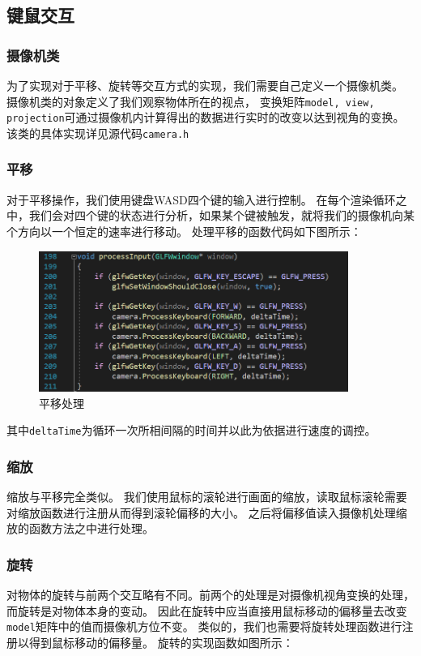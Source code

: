 \documentclass[UTF8]{ctexart}
\begin{document}
\subsection{键鼠交互}

\subsubsection{摄像机类}
\par
为了实现对于平移、旋转等交互方式的实现，我们需要自己定义一个摄像机类。
摄像机类的对象定义了我们观察物体所在的视点，
变换矩阵\verb|model, view, projection|可通过摄像机内计算得出的数据进行实时的改变以达到视角的变换。
该类的具体实现详见源代码\verb|camera.h|

\subsubsection{平移}
\par
对于平移操作，我们使用键盘WASD四个键的输入进行控制。
在每个渲染循环之中，我们会对四个键的状态进行分析，如果某个键被触发，就将我们的摄像机向某个方向以一个恒定的速率进行移动。
处理平移的函数代码如下图所示：

\begin{figure}[h]
	\centering
	\includegraphics*[width=0.9\textwidth]{4.png}
	\caption{平移处理}
	\label{fig:4}
\end{figure}
\par
其中\verb|deltaTime|为循环一次所相间隔的时间并以此为依据进行速度的调控。

\subsubsection{缩放}
\par
缩放与平移完全类似。
我们使用鼠标的滚轮进行画面的缩放，读取鼠标滚轮需要对缩放函数进行注册从而得到滚轮偏移的大小。
之后将偏移值读入摄像机处理缩放的函数方法之中进行处理。

\subsubsection{旋转}
\par
对物体的旋转与前两个交互略有不同。前两个的处理是对摄像机视角变换的处理，而旋转是对物体本身的变动。
因此在旋转中应当直接用鼠标移动的偏移量去改变\verb|model|矩阵中的值而摄像机方位不变。
类似的，我们也需要将旋转处理函数进行注册以得到鼠标移动的偏移量。
旋转的实现函数如图所示：
\end{document}
